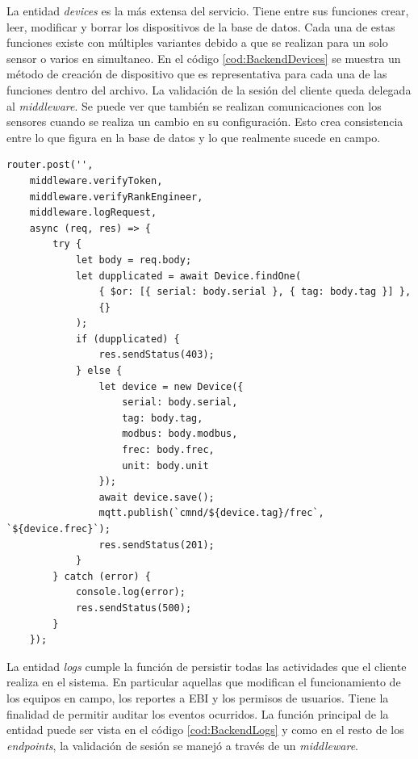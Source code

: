 La entidad \emph{devices} es la más extensa del servicio.
Tiene entre sus funciones crear, leer, modificar y borrar los dispositivos de la base de datos.
Cada una de estas funciones existe con múltiples variantes debido a que se realizan para un solo sensor o varios en simultaneo.
En el código \ref{cod:BackendDevices} se muestra un método de creación de dispositivo que es representativa para cada una de las funciones dentro del archivo.
La validación de la sesión del cliente queda delegada al \emph{middleware}.
Se puede ver que también se realizan comunicaciones con los sensores cuando se realiza un cambio en su configuración.
Esto crea consistencia entre lo que figura en la base de datos y lo que realmente sucede en campo.


\begin{lstlisting}[label=cod:BackendDevices,caption=Creación de dispositivo de la entidad devices]
router.post('',
    middleware.verifyToken,
    middleware.verifyRankEngineer,
    middleware.logRequest,
    async (req, res) => {
        try {
            let body = req.body;
            let dupplicated = await Device.findOne(
                { $or: [{ serial: body.serial }, { tag: body.tag }] },
                {}
            );
            if (dupplicated) {
                res.sendStatus(403);
            } else {
                let device = new Device({
                    serial: body.serial,
                    tag: body.tag,
                    modbus: body.modbus,
                    frec: body.frec,
                    unit: body.unit
                });
                await device.save();
                mqtt.publish(`cmnd/${device.tag}/frec`, `${device.frec}`);
                res.sendStatus(201);
            }
        } catch (error) {
            console.log(error);
            res.sendStatus(500);
        }
    });
\end{lstlisting}

La entidad \emph{logs} cumple la función de persistir todas las actividades que el cliente realiza en el sistema.
En particular aquellas que modifican el funcionamiento de los equipos en campo, los reportes a EBI y los permisos de usuarios.
Tiene la finalidad de permitir auditar los eventos ocurridos.
La función principal de la entidad puede ser vista en el código \ref{cod:BackendLogs} y como en el resto de los \emph{endpoints}, la validación de sesión se manejó a través de un \emph{middleware}.

\newpage

